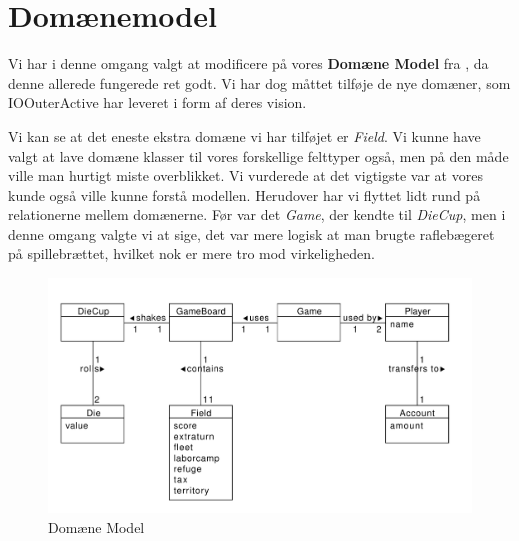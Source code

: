 \section{Domænemodel}
Vi har i denne omgang valgt at modificere på vores \textbf{Domæne Model} fra \citep{19del2}, da denne allerede fungerede ret godt. Vi har dog måttet tilføje de nye domæner, som IOOuterActive har leveret i form af deres vision.


Vi kan se at det eneste ekstra domæne vi har tilføjet er \textit{Field}. Vi kunne have valgt at lave domæne klasser til vores forskellige felttyper også, men på den måde ville man hurtigt miste overblikket. Vi vurderede at det vigtigste var at vores kunde også ville kunne forstå modellen. Herudover har vi flyttet lidt rund på relationerne mellem domænerne. Før var det \textit{Game}, der kendte til \textit{DieCup}, men i denne omgang valgte vi at sige, det var mere logisk at man brugte raflebægeret på spillebrættet, hvilket nok er mere tro mod virkeligheden.

\begin{figure}[!ht]
    \centering
    \includegraphics[width=1\textwidth]{Domainmodel.pdf}
    \caption[<Text for the list of figures>]{Domæne Model}
    \label{fig:domain}
\end{figure}